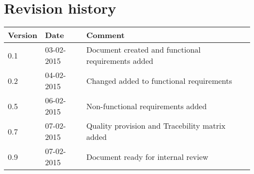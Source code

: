 \label{chp_revisionHistory}
\chapter{Revision history}

\begin{longtable}{| p{1.5cm}  | p{3cm} |  p{8cm} | }
	\hline
	\textbf{Version} & \textbf{Date} & \textbf{Comment} \\
	\hline
	0.1 & 03-02-2015 & Document created and functional requirements added  \\
	\hline
	0.2 & 04-02-2015 & Changed added to functional requirements \\
	\hline
	0.5 & 06-02-2015 & Non-functional requirements added \\
	\hline
	0.7 & 07-02-2015 & Quality provision and Tracebility matrix added \\
	\hline
	0.9 & 07-02-2015 & Document ready for internal review \\
	\hline
\end{longtable}

